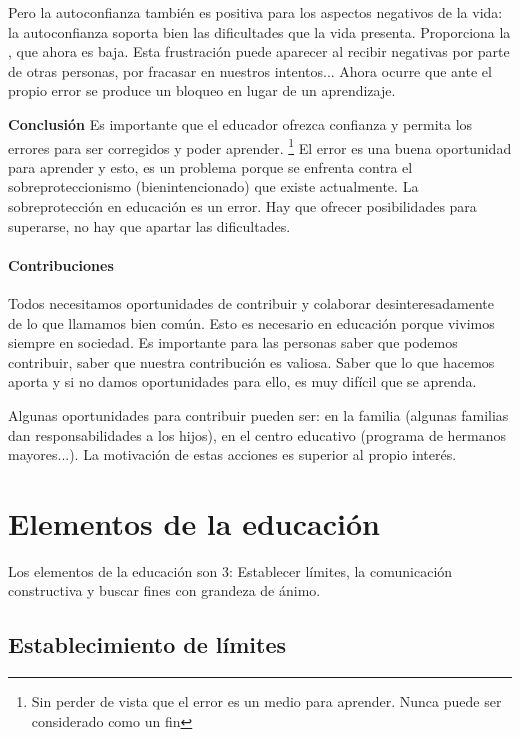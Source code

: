 \documentclass[palatino]{apuntesURJC}
\begin{document}
	Pero la autoconfianza también es positiva para los aspectos negativos de la vida: la autoconfianza soporta bien las dificultades que la vida presenta.
	Proporciona la , que ahora es baja.
	Esta frustración puede aparecer al recibir negativas por parte de otras personas, por fracasar en nuestros intentos... Ahora ocurre que ante el propio error se produce un bloqueo en lugar de un aprendizaje.

	\textbf{Conclusión} Es importante que el educador ofrezca confianza y permita los errores para ser corregidos y poder aprender. 
	\footnote{Sin perder de vista que el error es un medio para aprender. Nunca puede ser considerado como un fin}
	El error es una buena oportunidad para aprender y esto, es un problema porque se enfrenta contra el sobreproteccionismo (bienintencionado) que existe actualmente.
	La sobreprotección en educación es un error.
	Hay que ofrecer posibilidades para superarse, no hay que apartar las dificultades.

	\paragraph{Contribuciones}
	Todos necesitamos oportunidades de contribuir y colaborar desinteresadamente de lo que llamamos bien común. 
	Esto es necesario en educación porque vivimos siempre en sociedad. 
	Es importante para las personas saber que podemos contribuir, saber que nuestra contribución es valiosa. Saber que lo que hacemos aporta y si no damos oportunidades para ello, es muy difícil que se aprenda.

	Algunas oportunidades para contribuir pueden ser: en la familia (algunas familias dan responsabilidades a los hijos), en el centro educativo (programa de hermanos mayores...).
	La motivación de estas acciones es superior al propio interés.


\section{Elementos de la educación}

Los elementos de la educación son 3: Establecer límites, la comunicación constructiva y buscar fines con grandeza de ánimo.

\subsection{Establecimiento de límites}
\end{document}
